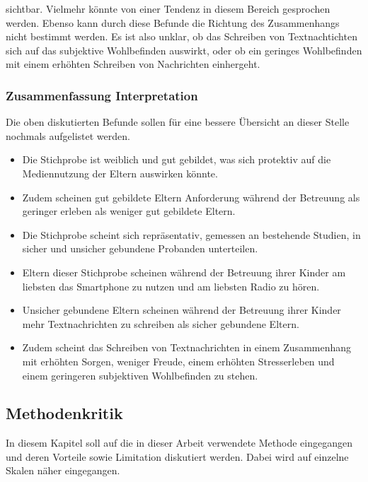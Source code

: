 sichtbar. Vielmehr könnte von einer Tendenz in diesem Bereich gesprochen werden. Ebenso kann durch diese Befunde die Richtung des Zusammenhangs nicht bestimmt werden. Es ist also unklar, ob das Schreiben von Textnachtichten sich auf das subjektive Wohlbefinden auswirkt, oder ob ein geringes Wohlbefinden mit einem erhöhten Schreiben von Nachrichten einhergeht.  


\subsubsection{Zusammenfassung Interpretation}
Die oben diskutierten Befunde sollen für eine bessere Übersicht an dieser Stelle nochmals aufgelistet werden.
\begin{itemize}
    \item Die Stichprobe ist weiblich und gut gebildet, was sich protektiv auf die Mediennutzung der Eltern auswirken könnte.  
    \item Zudem scheinen gut gebildete Eltern Anforderung während der Betreuung als geringer erleben als weniger gut gebildete Eltern.
    
    \item Die Stichprobe scheint sich repräsentativ, gemessen an bestehende Studien, in sicher und unsicher gebundene Probanden unterteilen.
    
    \item Eltern dieser Stichprobe scheinen während der Betreuung ihrer Kinder am liebsten das Smartphone zu nutzen und am liebsten Radio zu hören.
    
    \item Unsicher gebundene Eltern scheinen während der Betreuung ihrer Kinder mehr Textnachrichten zu schreiben als sicher gebundene Eltern. 
    
    \item Zudem scheint das Schreiben von Textnachrichten in einem Zusammenhang mit erhöhten Sorgen, weniger Freude, einem erhöhten Stresserleben und einem geringeren subjektiven Wohlbefinden zu stehen. 
\end{itemize}


\subsection{Methodenkritik} \label{sec:Methodenkritik}
In diesem Kapitel soll auf die in dieser Arbeit verwendete Methode eingegangen  und deren Vorteile sowie Limitation diskutiert werden. Dabei wird auf einzelne Skalen näher eingegangen.


